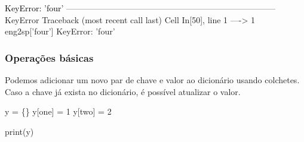 \documentclass[
  brazilian,
  letterpaper,
  DIV=11,
  numbers=noendperiod]{scrreprt}
\newenvironment{Shaded}{\begin{snugshade}}{\end{snugshade}}
\newcommand{\BuiltInTok}[1]{\textcolor[rgb]{0.00,0.23,0.31}{#1}}
\newcommand{\DecValTok}[1]{\textcolor[rgb]{0.68,0.00,0.00}{#1}}
\newcommand{\NormalTok}[1]{\textcolor[rgb]{0.00,0.23,0.31}{#1}}
\newcommand{\OperatorTok}[1]{\textcolor[rgb]{0.37,0.37,0.37}{#1}}
\newcommand{\StringTok}[1]{\textcolor[rgb]{0.13,0.47,0.30}{#1}}
\begin{document}
\begin{Highlighting}
\textcolor{black}{KeyError: 'four'}
\textcolor{black}{}\textcolor{QuartoInternalColor4}{---------------------------------------------------------------------------}\textcolor{QuartoInternalColor2}{}
\textcolor{QuartoInternalColor2}{}\textcolor{QuartoInternalColor4}{KeyError}\textcolor{QuartoInternalColor2}{                                  Traceback (most recent call last)}
\textcolor{QuartoInternalColor2}{}\textcolor{QuartoInternalColor1}{Cell}\textcolor{QuartoInternalColor2}{}\textcolor{QuartoInternalColor1}{ }\textcolor{QuartoInternalColor2}{}\textcolor{QuartoInternalColor3}{In[50]}\textcolor{QuartoInternalColor2}{}\textcolor{QuartoInternalColor3}{, line 1}\textcolor{QuartoInternalColor2}{}
\textcolor{QuartoInternalColor2}{}\textcolor{QuartoInternalColor3}{----> }\textcolor{QuartoInternalColor2}{}\textcolor{QuartoInternalColor3}{1}\textcolor{QuartoInternalColor2}{ }\textcolor{QuartoInternalColor2}{eng2sp}\textcolor{QuartoInternalColor2}{}\textcolor{QuartoInternalColor2}{[}\textcolor{QuartoInternalColor2}{}\textcolor{QuartoInternalColor2}{'}\textcolor{QuartoInternalColor2}{}\textcolor{QuartoInternalColor2}{four}\textcolor{QuartoInternalColor2}{}\textcolor{QuartoInternalColor2}{'}\textcolor{QuartoInternalColor2}{}\textcolor{QuartoInternalColor2}{]}\textcolor{QuartoInternalColor2}{}
\textcolor{QuartoInternalColor2}{}\textcolor{QuartoInternalColor4}{KeyError}\textcolor{QuartoInternalColor2}{: 'four'}
\end{Highlighting}

\subsubsection{Operações básicas}\label{operauxe7uxf5es-buxe1sicas-3}

Podemos adicionar um novo par de chave e valor ao dicionário usando
colchetes. Caso a chave já exista no dicionário, é possível atualizar o
valor.

\begin{Shaded}
\begin{Highlighting}[]
\NormalTok{y }\OperatorTok{=}\NormalTok{ \{\}}
\NormalTok{y[}\StringTok{\textquotesingle{}one\textquotesingle{}}\NormalTok{] }\OperatorTok{=} \DecValTok{1}
\NormalTok{y[}\StringTok{\textquotesingle{}two\textquotesingle{}}\NormalTok{] }\OperatorTok{=} \DecValTok{2}

\BuiltInTok{print}\NormalTok{(y)}
\end{Highlighting}
\end{Shaded}
\end{document}
